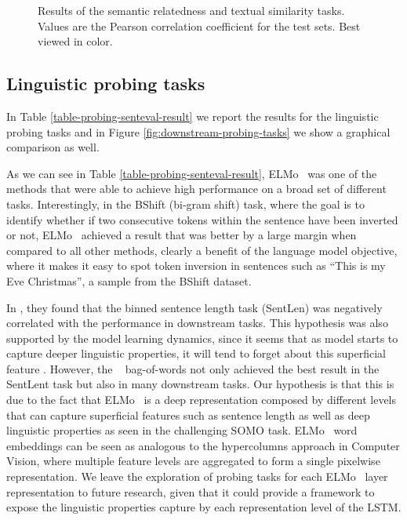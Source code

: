 \documentclass{article}
\begin{document}
\begin{figure}[!htb]
\caption{Results of the semantic relatedness and textual similarity tasks. Values are the Pearson correlation coefficient for the test sets. Best viewed in color.}
\label{fig:downstream-correlations-tasks}
\end{figure}


\subsection{Linguistic probing tasks}
In Table \ref{table-probing-senteval-result} we report the results for the linguistic probing tasks and in Figure \ref{fig:downstream-probing-tasks} we show a graphical comparison as well.

As we can see in Table \ref{table-probing-senteval-result}, ELMo~\cite{peters2018deep} was one of the methods that were able to achieve high performance on a broad set of different tasks. Interestingly, in the BShift (bi-gram shift) task, where the goal is to identify whether if two consecutive tokens within the sentence have been inverted or not, ELMo~\cite{peters2018deep} achieved a result that was better by a large margin when compared to all other methods, clearly a benefit of the language model objective, where it makes it easy to spot token inversion in sentences such as ``This is my Eve Christmas'', a sample from the BShift dataset.

In \cite{conneau2018you}, they found that the binned sentence length task (SentLen) was negatively correlated with the performance in downstream tasks. This hypothesis was also supported by the model learning dynamics, since it seems that as model starts to capture deeper linguistic
properties, it will tend to forget about this superficial feature \cite{conneau2018you}. However, the ~\cite{peters2018deep} bag-of-words not only achieved the best result in the SentLent task but also in many downstream tasks. Our hypothesis is that this is due to the fact that ELMo~\cite{peters2018deep} is a deep representation composed by different levels that can capture superficial features such as sentence length as well as deep linguistic properties as seen in the challenging SOMO task. ELMo~\cite{peters2018deep} word embeddings can be seen as analogous to the hypercolumns \cite{BharathCVPR2015} approach in Computer Vision, where multiple feature levels are aggregated to form a single pixelwise representation. We leave the exploration of probing tasks for each ELMo~\cite{peters2018deep} layer representation to future research, given that it could provide a framework to expose the linguistic properties capture by each representation level of the LSTM.
\end{document}
